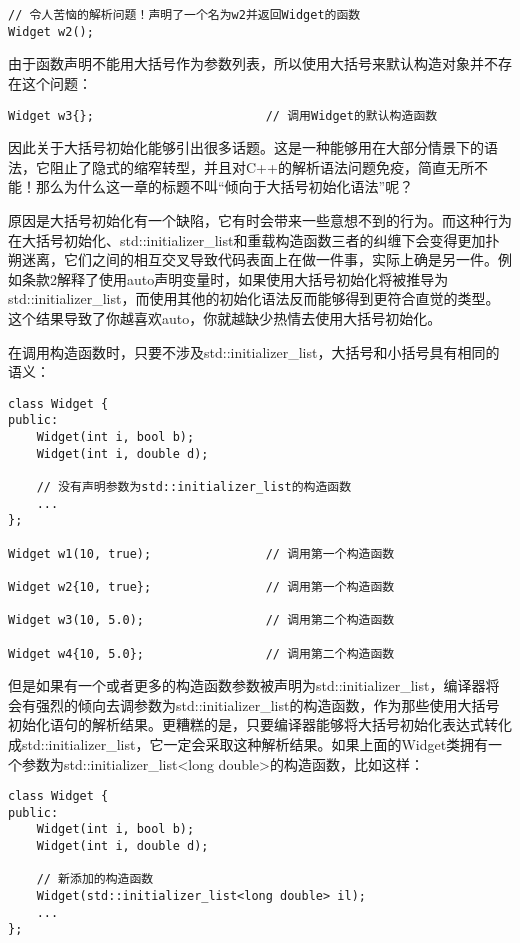 \begin{lstlisting}
// 令人苦恼的解析问题！声明了一个名为w2并返回Widget的函数
Widget w2();					
\end{lstlisting}

由于函数声明不能用大括号作为参数列表，所以使用大括号来默认构造对象并不存在这个问题：

\begin{lstlisting}
Widget w3{};						// 调用Widget的默认构造函数
\end{lstlisting}

因此关于大括号初始化能够引出很多话题。这是一种能够用在大部分情景下的语法，它阻止了隐式的缩窄转型，并且对C++的解析语法问题免疫，简直无所不能！那么为什么这一章的标题不叫“倾向于大括号初始化语法”呢？

原因是大括号初始化有一个缺陷，它有时会带来一些意想不到的行为。而这种行为在大括号初始化、std::initializer\_list和重载构造函数三者的纠缠下会变得更加扑朔迷离，它们之间的相互交叉导致代码表面上在做一件事，实际上确是另一件。例如条款2解释了使用auto声明变量时，如果使用大括号初始化将被推导为std::initializer\_list，而使用其他的初始化语法反而能够得到更符合直觉的类型。这个结果导致了你越喜欢auto，你就越缺少热情去使用大括号初始化。

在调用构造函数时，只要不涉及std::initializer\_list，大括号和小括号具有相同的语义：

\begin{lstlisting}
class Widget {
public:
	Widget(int i, bool b);		
	Widget(int i, double d);
	
	// 没有声明参数为std::initializer_list的构造函数
	...
};

Widget w1(10, true); 				// 调用第一个构造函数

Widget w2{10, true}; 				// 调用第一个构造函数

Widget w3(10, 5.0); 				// 调用第二个构造函数

Widget w4{10, 5.0}; 				// 调用第二个构造函数
\end{lstlisting}

但是如果有一个或者更多的构造函数参数被声明为std::initializer\_list，编译器将会有强烈的倾向去调参数为std::initializer\_list的构造函数，作为那些使用大括号初始化语句的解析结果。更糟糕的是，只要编译器能够将大括号初始化表达式转化成std::initializer\_list，它一定会采取这种解析结果。如果上面的Widget类拥有一个参数为std::initializer\_list<long double>的构造函数，比如这样：

\begin{lstlisting}
class Widget {
public:
	Widget(int i, bool b);
	Widget(int i, double d);

	// 新添加的构造函数
	Widget(std::initializer_list<long double> il);	
	...
};
\end{lstlisting}

